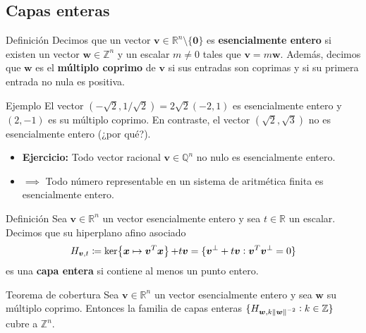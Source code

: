 \documentclass[aspectratio=169,professionalfonts]{beamer}
\newcommand{\Z}{\mathbb{Z}}
\newcommand{\Q}{\mathbb{Q}}
\newcommand{\R}{\mathbb{R}}
\newcommand{\norm}[1]{\left\lVert #1 \right\rVert}
\renewcommand{\ker}[1]{\mathop{\mathrm{ker}{\left\lbrace #1 \right\rbrace}}}
\renewcommand{\vec}[1]{\boldsymbol{#1}}
\newcommand{\braces}[1]{\lbrace #1 \rbrace}
\newcommand{\paren}[1]{\left( #1 \right)}
\newcommand{\clayer}[2]{H_{#1, #2}}
\newcommand{\qlayer}[2]{\clayer{\vec{#1}}{#2\norm{\vec{#1}}^{-2}}}
\begin{document}
\subsection{Capas enteras}
\begin{frame}
	\begin{block}{Definición}
		Decimos que un vector $\vec{v} \in \R^n \setminus \braces{\vec{0}}$ es
		\textbf{esencialmente entero} si existen un vector $\vec{w} \in \Z^n$ y
		un escalar $m \neq 0$ tales que $\vec{v} = m\vec{w}$. Además, decimos
		que $\vec{w}$ es el \textbf{múltiplo coprimo} de $\vec{v}$ si sus
		entradas son coprimas y si su primera entrada no nula es positiva.
	\end{block}
\end{frame}

\begin{frame}
	\begin{block}{Ejemplo}
		El vector $(-\sqrt{2}, 1/\sqrt{2}) = 2\sqrt{2}(-2, 1)$ es
		esencialmente entero y $(2, -1)$ es su múltiplo coprimo. En contraste,
		el vector $\paren{\sqrt{2}, \sqrt{3}}$ no es esencialmente entero (¿por
		qué?).
	\end{block}
	\begin{itemize}
		\item \textbf{Ejercicio:} Todo vector racional $\vec{v} \in \Q^n$ no
			nulo es esencialmente entero.
		\item $\implies$ Todo número representable en un sistema de aritmética
			finita es esencialmente entero.
	\end{itemize}
\end{frame}

\begin{frame}
	\begin{block}{Definición}
		Sea $\vec{v} \in \R^n$ un vector esencialmente entero y sea $t \in \R$ un
		escalar. Decimos que su hiperplano afino asociado
		\begin{equation*}
			\clayer{\vec{v}}{t} \coloneq \ker{\vec{x} \mapsto \vec{v}^T\vec{x}} + t\vec{v}
			= \lbrace \vec{v}^{\perp} + t\vec{v} \vcentcolon \vec{v}^T\vec{v}^{\perp} = 0 \rbrace
		\end{equation*}
		es una \textbf{capa entera} si contiene al menos un punto entero.
	\end{block}
	\begin{block}{Teorema de cobertura}
		Sea $\vec{v} \in \R^n$ un vector esencialmente entero y sea $\vec{w}$ su
		múltiplo coprimo. Entonces la familia de capas enteras
		$\braces{\qlayer{w}{k} \vcentcolon k \in \Z}$ cubre a
		$\Z^n$.
	\end{block}
\end{frame}
\end{document}
